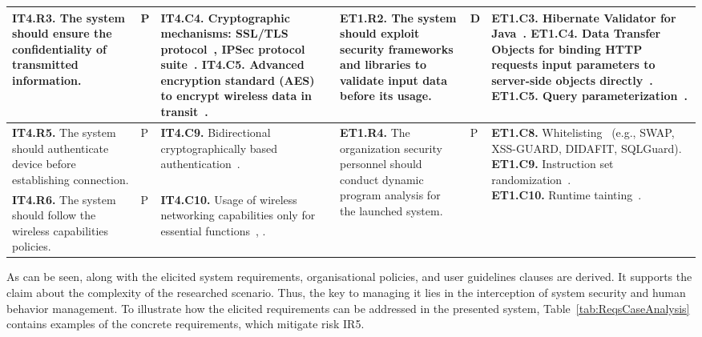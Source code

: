 \documentclass[manuscript]{acmart}
\begin{document}
\begin{table*}[htbp]
\begin{center}
\begin{tabular}{|p{2.6cm}|p{0.4cm}|p{3.4cm}||p{2.4cm}|p{0.4cm}|p{3.4cm}|}
	\scriptsize{\textbf{IT4.R3.} The system should ensure the confidentiality of transmitted information.}& \multirow{2}{*}{\scriptsize{P}} & \scriptsize{\textbf{IT4.C4.} Cryptographic mechanisms: SSL/TLS protocol~\cite{CISControls}, IPSec protocol suite~\cite{NistSP800_53}.}  \newline\scriptsize{\textbf{IT4.C5.}  Advanced encryption standard (AES) to encrypt wireless data in transit~\cite{CISControls}.} & \scriptsize{\textbf{ET1.R2.} The system should exploit security frameworks and libraries to validate input data before its usage.} & \multirow{2}{*}{\scriptsize{D}} & \scriptsize{\textbf{ET1.C3.} Hibernate Validator for Java~\cite{OWASP_webPage}.} \newline\scriptsize{\textbf{ET1.C4.} Data Transfer Objects for binding HTTP requests input parameters to server-side objects directly~\cite{OWASP_webPage}.} \newline\scriptsize{\textbf{ET1.C5.} Query parameterization~\cite{OWASP_webPage}.}\\ \hline

	\scriptsize{\textbf{IT4.R5.} The system should authenticate device before establishing connection.} & \scriptsize{P} & \scriptsize{\textbf{IT4.C9.} Bidirectional cryptographically based authentication~\cite{NistSP800_53}.} & \multirow{2}{2.4cm}{\scriptsize{\textbf{ET1.R4.} The organization security personnel should conduct dynamic program analysis for the launched system.}} & \multirow{2}{0.4cm}{\scriptsize{P}} & \multirow{2}{3.4cm}{\scriptsize{\textbf{ET1.C8.} Whitelisting ~\cite{FatalInjection}(e.g., SWAP, XSS-GUARD, DIDAFIT, SQLGuard).} \scriptsize{\textbf{ET1.C9.} Instruction set randomization~\cite{FatalInjection}.}
    \newline\scriptsize{\textbf{ET1.C10.} Runtime tainting~\cite{FatalInjection}.}}  \\ \cline{1-3}
	
	\scriptsize{\textbf{IT4.R6.} The system should follow the wireless capabilities policies.} & \scriptsize{P} &\scriptsize{\textbf{IT4.C10.} Usage of wireless networking capabilities only for essential functions~\cite{CISControls}, \cite{NistSP800_53}.}&&&\label{tab:SecReqsIdentification}\\\hline
\end{tabular}
\end{center}
\end{table*}

As can be seen, along with the elicited system requirements, organisational policies, and user guidelines clauses are derived. It supports the claim about the complexity of the researched scenario. Thus, the key to managing it lies in the interception of system security and human behavior management.
To illustrate how the elicited requirements can be addressed in the presented system, Table~\ref{tab:ReqsCaseAnalysis} contains examples of the concrete requirements, which mitigate risk IR5.
\end{document}
